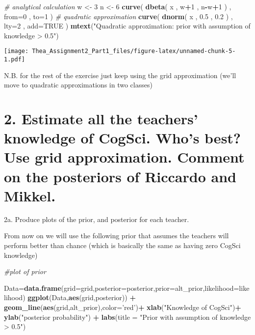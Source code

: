 \documentclass[]{article}
\newenvironment{Shaded}{\begin{snugshade}}{\end{snugshade}}
\newcommand{\KeywordTok}[1]{\textcolor[rgb]{0.13,0.29,0.53}{\textbf{#1}}}
\newcommand{\DataTypeTok}[1]{\textcolor[rgb]{0.13,0.29,0.53}{#1}}
\newcommand{\DecValTok}[1]{\textcolor[rgb]{0.00,0.00,0.81}{#1}}
\newcommand{\FloatTok}[1]{\textcolor[rgb]{0.00,0.00,0.81}{#1}}
\newcommand{\StringTok}[1]{\textcolor[rgb]{0.31,0.60,0.02}{#1}}
\newcommand{\CommentTok}[1]{\textcolor[rgb]{0.56,0.35,0.01}{\textit{#1}}}
\newcommand{\OtherTok}[1]{\textcolor[rgb]{0.56,0.35,0.01}{#1}}
\newcommand{\OperatorTok}[1]{\textcolor[rgb]{0.81,0.36,0.00}{\textbf{#1}}}
\newcommand{\NormalTok}[1]{#1}
\begin{document}
\begin{Shaded}
\begin{Highlighting}[]
\CommentTok{# analytical calculation}
\NormalTok{w <-}\StringTok{ }\DecValTok{3}
\NormalTok{n <-}\StringTok{ }\DecValTok{6}
\KeywordTok{curve}\NormalTok{( }\KeywordTok{dbeta}\NormalTok{( x , w}\OperatorTok{+}\DecValTok{1}\NormalTok{ , n}\OperatorTok{-}\NormalTok{w}\OperatorTok{+}\DecValTok{1}\NormalTok{ ) , }\DataTypeTok{from=}\DecValTok{0}\NormalTok{ , }\DataTypeTok{to=}\DecValTok{1}\NormalTok{ )}
\CommentTok{# quadratic approximation}
\KeywordTok{curve}\NormalTok{( }\KeywordTok{dnorm}\NormalTok{( x , }\FloatTok{0.5}\NormalTok{ , }\FloatTok{0.2}\NormalTok{ ) , }\DataTypeTok{lty=}\DecValTok{2}\NormalTok{ , }\DataTypeTok{add=}\OtherTok{TRUE}\NormalTok{ )}
\KeywordTok{mtext}\NormalTok{(}\StringTok{"Quadratic approximation: prior with assumption of knowledge > 0.5"}\NormalTok{)}
\end{Highlighting}
\end{Shaded}

\texttt{[image: Thea\_Assignment2\_Part1\_files/figure-latex/unnamed-chunk-5-1.pdf]}

N.B. for the rest of the exercise just keep using the grid approximation
(we'll move to quadratic approximations in two classes)

\section{2. Estimate all the teachers' knowledge of CogSci. Who's best?
Use grid approximation. Comment on the posteriors of Riccardo and
Mikkel.}\label{estimate-all-the-teachers-knowledge-of-cogsci.-whos-best-use-grid-approximation.-comment-on-the-posteriors-of-riccardo-and-mikkel.}

2a. Produce plots of the prior, and posterior for each teacher.

From now on we will use the following prior that assumes the teachers
will perform better than chance (which is basically the same as having
zero CogSci knowledge)

\begin{Shaded}
\begin{Highlighting}[]
\CommentTok{#plot of prior}

\NormalTok{Data=}\KeywordTok{data.frame}\NormalTok{(}\DataTypeTok{grid=}\NormalTok{grid,}\DataTypeTok{posterior=}\NormalTok{posterior,}\DataTypeTok{prior=}\NormalTok{alt_prior,}\DataTypeTok{likelihood=}\NormalTok{likelihood)}
\KeywordTok{ggplot}\NormalTok{(Data,}\KeywordTok{aes}\NormalTok{(grid,posterior)) }\OperatorTok{+}\StringTok{ }\KeywordTok{geom_line}\NormalTok{(}\KeywordTok{aes}\NormalTok{(grid,alt_prior),}\DataTypeTok{color=}\StringTok{'red'}\NormalTok{)}\OperatorTok{+}\StringTok{ }\KeywordTok{xlab}\NormalTok{(}\StringTok{"Knowledge of CogSci"}\NormalTok{)}\OperatorTok{+}\StringTok{ }\KeywordTok{ylab}\NormalTok{(}\StringTok{"posterior probability"}\NormalTok{) }\OperatorTok{+}\StringTok{ }\KeywordTok{labs}\NormalTok{(}\DataTypeTok{title =} \StringTok{"Prior with assumption of knowledge > 0.5"}\NormalTok{)}
\end{Highlighting}
\end{Shaded}
\end{document}
